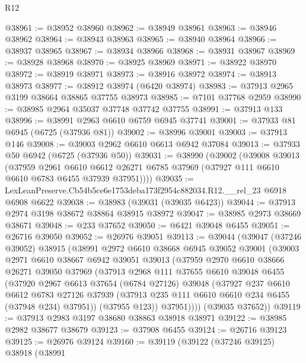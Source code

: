 \begin{lexlean}{R12}
\begin{coremodule}
@38961 := @38952 @38960
@38962 := @38949 @38961
@38963 := @38946 @38962
@38964 := @38943 @38963
@38965 := @38940 @38964
@38966 := @38937 @38965
@38967 := @38934 @38966
@38968 := @38931 @38967
@38969 := @38928 @38968
@38970 := @38925 @38969
@38971 := @38922 @38970
@38972 := @38919 @38971
@38973 := @38916 @38972
@38974 := @38913 @38973
@38977 := @38912 @38974 (@6420 @38974)
@38983 := @37913 @2965 @3199 @38664 @38865 @37755 @38973
@38985 := @7101 @37768 @2959
@38990 := @38985 @2964 @35037 @37748 @37742 @37755
@38991 := @37913 @133
@38996 := @38991 @2963 @6610 @6759 @6945 @37741
@39001 := @37933 @81 @6945 (@6725 (@37936 @81))
@39002 := @38996 @39001
@39003 := @37913 @146
@39008 := @39003 @2962 @6610 @6613 @6942 @37084
@39013 := @37933 @50 @6942 (@6725 (@37936 @50))
@39031 := @38990
    (@39002
      (@39008
        @39013
        (@37959
          @2961
          @6610
          @6612
          @26271
          @6785
          @37969
          (@37927 @111 @6610 @6610 @6783 @6455 @37939 @37951))))
@39035 := LexLeanPreserve.Cb54b5ce6e1753deba173f2954c882034.R12.__rel_23 @6918 @6908 @6622
@39038 := @38983 (@39031 (@39035 @6423))
@39044 := @37913 @2974 @3198 @38672 @38864 @38915 @38972
@39047 := @38985 @2973 @38669 @38671
@39048 := @233 @37652
@39050 := @6421 @39048 @6455
@39051 := @26716 @39050
@39052 := @26976 @39051
@39113 := @39044
    (@39047
      (@37246 @39052)
      @38915
      (@38991
        @2972
        @6610
        @38668
        @6945
        @39052
        @39001
        (@39003
          @2971
          @6610
          @38667
          @6942
          @39051
          @39013
          (@37959
            @2970
            @6610
            @38666
            @26271
            @39050
            @37969
            (@37913
              @2968
              @111
              @37655
              @6610
              @39048
              @6455
              (@37920
                @2967
                @6613
                @37654
                (@6784 @27126)
                @39048
                (@37927
                  @237
                  @6610
                  @6612
                  @6783
                  @27126
                  @37939
                  (@37913 @235 @111 @6610 @6610 @234 @6455 (@37948 @234) @37951))
                (@37955 @123))
              @37951))))
      (@39035 @37652))
@39119 := @37913 @2983 @3197 @38680 @38863 @38918 @38971
@39122 := @38985 @2982 @38677 @38679
@39123 := @37908 @6455
@39124 := @26716 @39123
@39125 := @26976 @39124
@39160 := @39119
    (@39122
      (@37246 @39125)
      @38918
      (@38991

\end{coremodule}
\end{lexlean}
